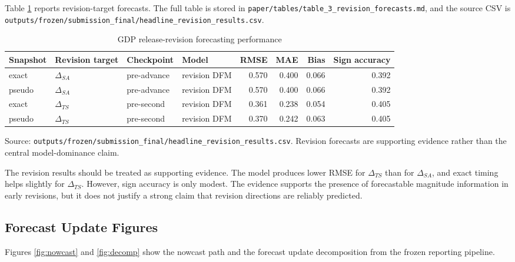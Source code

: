 \documentclass[12pt]{article}
\begin{document}
Table \ref{tab:revision} reports revision-target forecasts. The full table is stored in \texttt{paper/tables/table\_3\_revision\_forecasts.md}, and the source CSV is \texttt{outputs/frozen/submission\_final/headline\_revision\_results.csv}.

\begin{table}[!htbp]
\centering
\begin{threeparttable}
\caption{GDP release-revision forecasting performance}
\label{tab:revision}
\small
\begin{tabular}{llllrrrr}
\toprule
Snapshot & Revision target & Checkpoint & Model & RMSE & MAE & Bias & Sign accuracy \\
\midrule
exact & $\Delta_{SA}$ & pre-advance & revision DFM & 0.570 & 0.400 & 0.066 & 0.392 \\
pseudo & $\Delta_{SA}$ & pre-advance & revision DFM & 0.570 & 0.400 & 0.066 & 0.392 \\
exact & $\Delta_{TS}$ & pre-second & revision DFM & 0.361 & 0.238 & 0.054 & 0.405 \\
pseudo & $\Delta_{TS}$ & pre-second & revision DFM & 0.370 & 0.242 & 0.063 & 0.405 \\
\bottomrule
\end{tabular}
\begin{tablenotes}
\footnotesize
\item Source: \texttt{outputs/frozen/submission\_final/headline\_revision\_results.csv}. Revision forecasts are supporting evidence rather than the central model-dominance claim.
\end{tablenotes}
\end{threeparttable}
\end{table}

The revision results should be treated as supporting evidence. The model produces lower RMSE for $\Delta_{TS}$ than for $\Delta_{SA}$, and exact timing helps slightly for $\Delta_{TS}$. However, sign accuracy is only modest. The evidence supports the presence of forecastable magnitude information in early revisions, but it does not justify a strong claim that revision directions are reliably predicted.

\subsection{Forecast Update Figures}

Figures \ref{fig:nowcast} and \ref{fig:decomp} show the nowcast path and the forecast update decomposition from the frozen reporting pipeline.
\end{document}
